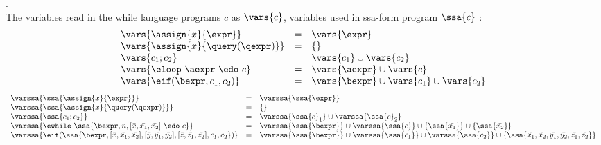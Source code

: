 \begin{defn}.
\\
{
The variables read in the while language programs $c$ as $\vars{c}$, variables used in ssa-form program $\ssa{c}$ : 
}
\[
\begin{array}{lll}
    \vars{\assign{x}{\expr}} & =& \vars{\expr}  \\
    \vars{\assign{x}{\query(\qexpr)}} & =&\{  \} \\
    \vars{ c_1; c_2  }  & = & \vars{c_1} \cup \vars{c_2} \\
    \vars{  \eloop ~ \aexpr ~ \edo ~ c  } &= &\vars{\aexpr} \cup \vars{c} \\
    \vars{\eif(\bexpr, c_1, c_2)} & =& \vars{\bexpr} \cup \vars{c_1} \cup \vars{c_2}\\
\end{array}
\]
\[
\begin{array}{lll}
    \varssa{\ssa{\assign{x}{\expr}}} & =& \varssa{\ssa{\expr}}  \\
    \varssa{\ssa{\assign{x}{\query(\qexpr)}}} & =& \{  \} \\
    \varssa{ \ssa{c_1; c_2}  }  & = & \varssa{\ssa{c}_1} \cup \varssa{\ssa{c}_2} \\
    {\varssa{  \ewhile ~ \ssa{\bexpr, n, [\bar{x}, \bar{x_1}, \bar{x_2}] ~ \edo ~ c} }} 
    &= &
    \varssa{\ssa{\bexpr}} \cup \varssa{\ssa{c}}  \cup \{ \ssa{\bar{x_1}} \} \cup \{ \ssa{\bar{x_2}} \}\\
    \varssa{\eif(\ssa{\bexpr,[\bar{x}, \bar{x_1}, \bar{x_2}], [\bar{y}, \bar{y_1}, \bar{y_2}],[\bar{z}, \bar{z_1}, \bar{z_2}], c_1, c_2} )} & =& \varssa{\ssa{\bexpr}} \cup \varssa{\ssa{c_1}} \cup \varssa{\ssa{c_2}} \cup \{\ssa{\bar{x_1}, \bar{x_2},\bar{y_1}, \bar{y_2},\bar{z_1}, \bar{z_2} }\}  \\
\end{array}
\]
\end{defn}
%
